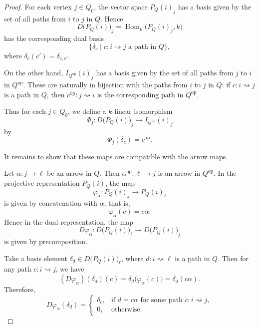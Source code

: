 \documentclass[11pt, a4paper]{report}
\begin{document}
        \begin{proof}
        For each vertex \(j\in Q_0\), the vector space \(P_Q(i)_j\) has a basis given by the set
        of all paths from \(i\) to \(j\) in \(Q\). Hence
        \[
        D\bigl(P_Q(i)\bigr)_j=\operatorname{Hom}_k\bigl(P_Q(i)_j,k\bigr)
        \]
        has the corresponding dual basis
        \[
        \{\delta_c \mid c:i\rightsquigarrow j \text{ a path in }Q\},
        \]
        where \(\delta_c(c')=\delta_{c,c'}\).

        On the other hand, \(I_{Q^{\operatorname{op}}}(i)_j\) has a basis given by the set of all
        paths from \(j\) to \(i\) in \(Q^{\operatorname{op}}\). These are naturally in bijection with
        the paths from \(i\) to \(j\) in \(Q\): if \(c:i\rightsquigarrow j\) is a path in \(Q\), then
        \(c^{\operatorname{op}}:j\rightsquigarrow i\) is the corresponding path in \(Q^{\operatorname{op}}\).

        Thus for each \(j\in Q_0\), we define a \(k\)-linear isomorphism
        \[
        \Phi_j:D\bigl(P_Q(i)\bigr)_j\longrightarrow I_{Q^{\operatorname{op}}}(i)_j
        \]
        by
        \[
        \Phi_j(\delta_c)=c^{\operatorname{op}}.
        \]

        It remains to show that these maps are compatible with the arrow maps.

        Let \(\alpha:j\to \ell\) be an arrow in \(Q\). Then \(\alpha^{\operatorname{op}}:\ell\to j\)
        is an arrow in \(Q^{\operatorname{op}}\). In the projective representation \(P_Q(i)\), the map
        \[
        \varphi_\alpha:P_Q(i)_j\longrightarrow P_Q(i)_\ell
        \]
        is given by concatenation with \(\alpha\), that is,
        \[
        \varphi_\alpha(c)=c\alpha.
        \]
        Hence in the dual representation, the map
        \[
        D\varphi_\alpha:
        D\bigl(P_Q(i)\bigr)_\ell\longrightarrow D\bigl(P_Q(i)\bigr)_j
        \]
        is given by precomposition.

        Take a basis element \(\delta_d\in D\bigl(P_Q(i)\bigr)_\ell\), where \(d:i\rightsquigarrow \ell\)
        is a path in \(Q\). Then for any path \(c:i\rightsquigarrow j\), we have
        \[
        (D\varphi_\alpha)(\delta_d)(c)
        =
        \delta_d\bigl(\varphi_\alpha(c)\bigr)
        =
        \delta_d(c\alpha).
        \]
        Therefore,
        \[
        D\varphi_\alpha(\delta_d)
        =
        \begin{cases}
        \delta_c, & \text{if } d=c\alpha \text{ for some path } c:i\rightsquigarrow j,\\[1mm]
        0, & \text{otherwise.}
        \end{cases}
        \]


\end{proof}
\end{document}
